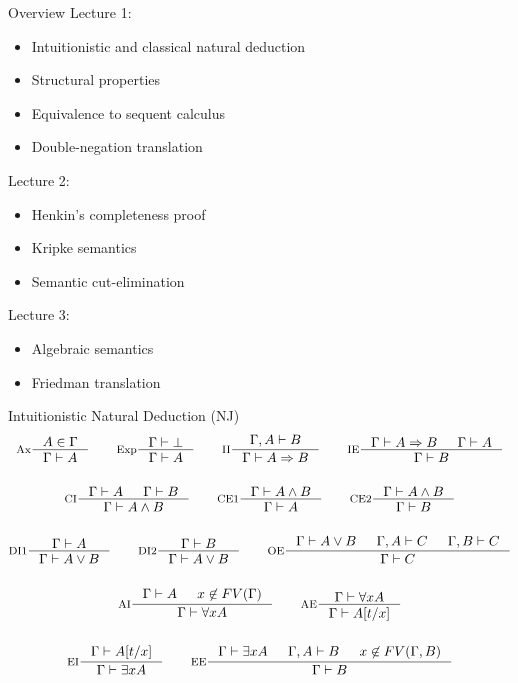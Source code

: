 \documentclass[xcolor=dvipsnames,aspectratio=169,handout]{beamer}
\begin{document}
\begin{frame}{Overview}
	Lecture 1:
	\begin{itemize}
		\item
		Intuitionistic and classical natural deduction
		\item
		Structural properties
		\item
		Equivalence to sequent calculus
		\item
		Double-negation translation
	\end{itemize}
	
	\vspace{0.2cm}
	Lecture 2:
	\begin{itemize}
		\item
		Henkin's completeness proof
		\item
		Kripke semantics
		\item
		Semantic cut-elimination
	\end{itemize}
	
	\vspace{0.2cm}
	Lecture 3:
	\begin{itemize}
		\item
		Algebraic semantics
		\item
		Friedman translation
	\end{itemize}
\end{frame}

\begin{frame}{Intuitionistic Natural Deduction (NJ)}
	\begin{gather*}
		\inference[Ax]{A\in \Gamma}{\Gamma\vdash A}\hspace{2em}
		\inference[Exp]{\Gamma\vdash\bot}{\Gamma\vdash A}\hspace{2em}
		\inference[II]{\Gamma,A\vdash B}{\Gamma\vdash A\to B}\hspace{2em}
		\inference[IE]{\Gamma\vdash A\to B& \Gamma \vdash A}{\Gamma \vdash B}\\[0,5cm]
		\inference[CI]{\Gamma\vdash A&\Gamma\vdash B}{\Gamma \vdash A\land B}\hspace{2em}
		\inference[CE1]{\Gamma\vdash A\land B}{\Gamma \vdash A}\hspace{2em}
		\inference[CE2]{\Gamma\vdash A\land B}{\Gamma \vdash B}\\[0,5cm]
		\inference[DI1]{\Gamma\vdash A}{\Gamma\vdash A\lor B}\hspace{2em}
		\inference[DI2]{\Gamma\vdash B}{\Gamma\vdash A\lor B}\hspace{2em}
		\inference[OE]{\Gamma\vdash A\lor B&\Gamma,A\vdash C&\Gamma,B\vdash C}{\Gamma \vdash C}\\[0,5cm]
		\inference[AI]{\Gamma \vdash A & x\not\in FV(\Gamma)}{\Gamma\vdash \forall x A}\hspace{2em}
		\inference[AE]{\Gamma\vdash \forall x A}{\Gamma\vdash A[t/x]}\\[0,5cm]
		\inference[EI]{\Gamma\vdash A[t/x]}{\Gamma\vdash \exists x A}\hspace{2em}
		\inference[EE]{\Gamma\vdash \exists x A&\Gamma,A\vdash B&x\not\in FV(\Gamma,B)}{\Gamma\vdash B}
	\end{gather*}
\end{frame}
\end{document}
